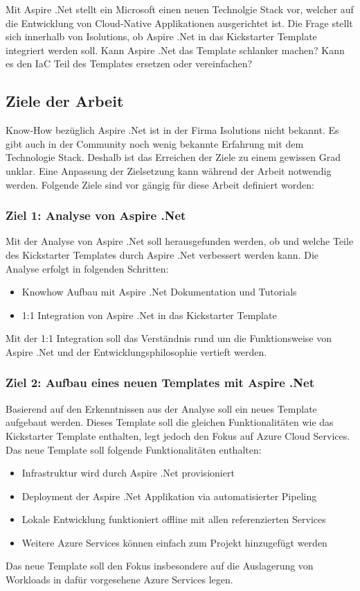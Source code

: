             Mit Aspire .Net stellt ein Microsoft einen neuen Technolgie Stack vor, welcher auf die Entwicklung von Cloud-Native Applikationen ausgerichtet ist. Die Frage stellt sich innerhalb von Isolutions, ob Aspire .Net in das Kickstarter Template integriert werden soll. Kann Aspire .Net das Template schlanker machen? Kann es den IaC Teil des Templates ersetzen oder vereinfachen?

    \subsection{Ziele der Arbeit}
        Know-How bezüglich Aspire .Net ist in der Firma Isolutions nicht bekannt. Es gibt auch in der Community noch wenig bekannte Erfahrung mit dem Technologie Stack. Deshalb ist das Erreichen der Ziele zu einem gewissen Grad unklar. Eine Anpassung der Zielsetzung kann während der Arbeit notwendig werden.
        Folgende Ziele sind vor gängig für diese Arbeit definiert worden:

        \subsubsection{Ziel 1: Analyse von Aspire .Net}
            Mit der Analyse von Aspire .Net soll herausgefunden werden, ob und welche Teile des Kickstarter Templates durch Aspire .Net verbessert werden kann. Die Analyse erfolgt in folgenden Schritten:
            \begin{itemize}
                \item Knowhow Aufbau mit Aspire .Net Dokumentation und Tutorials
                \item 1:1 Integration von Aspire .Net in das Kickstarter Template
            \end{itemize}
            Mit der 1:1 Integration soll das Verständnis rund um die Funktionsweise von Aspire .Net und der Entwicklungsphilosophie vertieft werden.

        \subsubsection{Ziel 2: Aufbau eines neuen Templates mit Aspire .Net}
            Basierend auf den Erkenntnissen aus der Analyse soll ein neues Template aufgebaut werden. Dieses Template soll die gleichen Funktionalitäten wie das Kickstarter Template enthalten, legt jedoch den Fokus auf Azure Cloud Services. Das neue Template soll folgende Funktionalitäten enthalten:
            \begin{itemize}
                \item Infrastruktur wird durch Aspire .Net provisioniert
                \item Deployment der Aspire .Net Applikation via automatisierter Pipeling
                \item Lokale Entwicklung funktioniert offline mit allen referenzierten Services
                \item Weitere Azure Services können einfach zum Projekt hinzugefügt werden
            \end{itemize}
            Das neue Template soll den Fokus insbesondere auf die Auslagerung von Workloads in dafür vorgesehene Azure Services legen.

